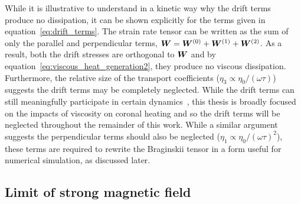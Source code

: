 While it is illustrative to understand in a kinetic way why the drift terms produce no dissipation, it can be shown explicitly for the terms given in equation~\ref{eq:drift_terms}. The strain rate tensor can be written as the sum of only the parallel and perpendicular terms, ${\bm W} = {\bm W}^{(0)} + {\bm W}^{(1)} + {\bm W}^{(2)}$. As a result, both the drift stresses are orthogonal to ${\bm W}$ and by equation~\ref{eq:viscous_heat_generation2}, they produce no viscous dissipation. Furthermore, the relative size of the transport coefficients ($\eta_3 \propto \eta_0/(\omega\tau)$) suggests the drift terms may be completely neglected. While the drift terms can still meaningfully participate in certain dynamics~\cite{dellarPlanarChannelFlow2011,ferraroFiniteElementImplementation2006}, this thesis is broadly focused on the impacts of viscosity on coronal heating and so the drift terms will be neglected throughout the remainder of this work. While a similar argument suggests the perpendicular terms should also be neglected ($\eta_1 \propto \eta_0/(\omega\tau)^2$), these terms are required to rewrite the Braginskii tensor in a form useful for numerical simulation, as discussed later.

\subsection{Limit of strong magnetic field}

